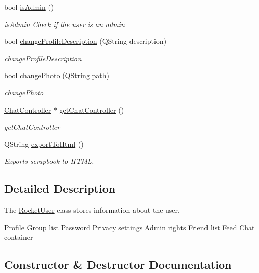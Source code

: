 \begin{DoxyCompactItemize}
\item 
bool \hyperlink{classRocketUser_ac6557be85ae1d3d5330839a76953c8fe}{is\+Admin} ()
\begin{DoxyCompactList}\small\item\em is\+Admin Check if the user is an admin \end{DoxyCompactList}\item 
bool \hyperlink{classRocketUser_a4dc9da3f41f783ff627a0e628115cdae}{change\+Profile\+Description} (Q\+String description)
\begin{DoxyCompactList}\small\item\em change\+Profile\+Description \end{DoxyCompactList}\item 
bool \hyperlink{classRocketUser_a987bf1e4eb4458cabce1c146bd964e92}{change\+Photo} (Q\+String path)
\begin{DoxyCompactList}\small\item\em change\+Photo \end{DoxyCompactList}\item 
\hyperlink{classChatController}{Chat\+Controller} $\ast$ \hyperlink{classRocketUser_aa8432e8b7dc02a9ed45bd25a9c444ae8}{get\+Chat\+Controller} ()
\begin{DoxyCompactList}\small\item\em get\+Chat\+Controller \end{DoxyCompactList}\item 
Q\+String \hyperlink{classRocketUser_a78672a60c514748aa64d8307e14d7c46}{export\+To\+Html} ()
\begin{DoxyCompactList}\small\item\em Exports scrapbook to H\+T\+ML. \end{DoxyCompactList}\end{DoxyCompactItemize}


\subsection{Detailed Description}
The \hyperlink{classRocketUser}{Rocket\+User} class stores information about the user. 

\hyperlink{classProfile}{Profile} \hyperlink{classGroup}{Group} list Password Privacy settings Admin rights Friend list \hyperlink{classFeed}{Feed} \hyperlink{classChat}{Chat} container 

\subsection{Constructor \& Destructor Documentation}
